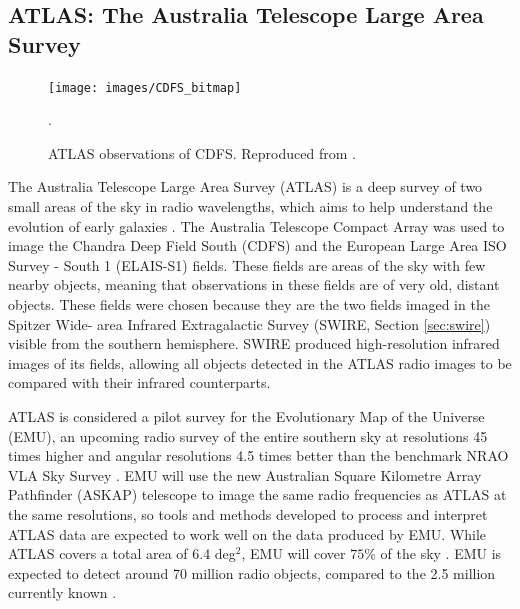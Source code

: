         \subsection{ATLAS: The Australia Telescope Large Area Survey}
        \label{sec:atlas}

            \begin{figure}[!ht]
              \centering
              \texttt{[image: images/CDFS\_bitmap]}
              \caption{ATLAS observations of CDFS. Reproduced from \citet{franzen15}.}.
              \label{fig:cdfs}
            \end{figure}

            The Australia Telescope Large Area Survey (ATLAS) is a deep
             survey of two small areas of the sky in radio
            wavelengths, which aims to help understand the evolution of early
            galaxies \citep{norris06}. The Australia Telescope Compact Array was
            used to image the Chandra Deep Field South (CDFS) and the European
            Large Area ISO Survey - South 1 (ELAIS-S1) fields. These fields are
            areas of the sky with few nearby objects, meaning that observations
            in these fields are of very old, distant objects. These fields were
            chosen because they are the two fields imaged in the Spitzer Wide-
            area Infrared Extragalactic Survey (SWIRE, Section \ref{sec:swire})
            visible from the southern hemisphere. SWIRE produced high-resolution
            infrared images of its fields, allowing all objects detected in the
            ATLAS radio images to be compared with their infrared counterparts.

            ATLAS is considered a pilot survey for the Evolutionary Map
            of the Universe (EMU), an upcoming radio survey of the entire
            southern sky at resolutions 45 times higher and angular resolutions
            4.5 times better than the benchmark NRAO VLA Sky Survey
            \citep{norris11b}. EMU will use the new Australian Square Kilometre
            Array Pathfinder (ASKAP) telescope to image the same radio
            frequencies as ATLAS at the same resolutions, so tools and methods
            developed to process and interpret ATLAS data are expected to work
            well on the data produced by EMU. While ATLAS covers a total area of
            6.4 deg$^2$, EMU will cover $75\%$ of the sky \citep{norris11b,
            norris16}. EMU is expected to detect around 70 million radio
            objects, compared to the 2.5 million currently known
            \citep{banfield15}.

